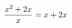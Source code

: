 \documentclass[preview]{standalone}
\begin{document}
\begin{align*}
\special{dvisvgm:raw <g id='unique000'>}\frac{x^2+2x}{x}=x+2x\special{dvisvgm:raw </g>}
\end{align*}
\end{document}
